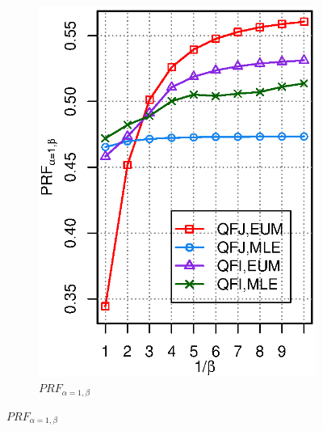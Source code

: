 \begin{figure}[H]
\begin{subfigure}[b]{0.45\columnwidth}
\includegraphics[width=\columnwidth]{figure/qf13-prfaf-qfi-qfj.eps}
\caption{$P\!R\!F_{\alpha=1,\beta}$}
\end{subfigure}
\end{figure}

